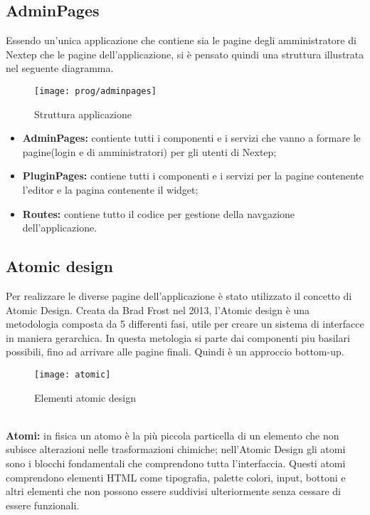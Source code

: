 \subsection{AdminPages}
Essendo un'unica applicazione che contiene sia le pagine degli amministratore di Nextep che le pagine dell'applicazione, si è pensato quindi una struttura illustrata nel seguente diagramma.
\begin{figure}[!h] 
	\centering 
	\texttt{[image: prog/adminpages]} 
	\caption{Struttura applicazione}
\end{figure}
\begin{itemize}
	\item \textbf{AdminPages:} contiente tutti i componenti e i servizi che vanno a formare le pagine(login e di amministratori) per gli utenti di Nextep;
	\item \textbf{PluginPages:} contiene tutti i componenti e i servizi per la pagine contenente l'editor e la pagina contenente il widget;
	\item \textbf{Routes:} contiene tutto il codice per gestione della navgazione dell'applicazione.
\end{itemize}
\newpage
\subsection{Atomic design}
Per realizzare le diverse pagine dell'applicazione è stato utilizzato il concetto di Atomic Design.
Creata da Brad Frost nel 2013, l'Atomic design è una metodologia composta da 5 differenti fasi, utile per creare un sistema di interfacce in maniera gerarchica. In questa metologia si parte dai componenti piu basilari possibili, fino ad arrivare alle pagine finali. Quindi è un approccio bottom-up.
\begin{figure}[!h] 
	\centering 
	\texttt{[image: atomic]} 
	\caption{Elementi atomic design}
\end{figure}
\\

\textbf{Atomi:} in fisica un atomo è la più piccola particella di un elemento che non subisce alterazioni nelle trasformazioni chimiche; nell’Atomic Design gli atomi sono i blocchi fondamentali che comprendono tutta l’interfaccia.
Questi atomi comprendono elementi HTML come tipografia, palette colori, input, bottoni e altri elementi che non possono essere suddivisi ulteriormente senza cessare di essere funzionali.
\\


